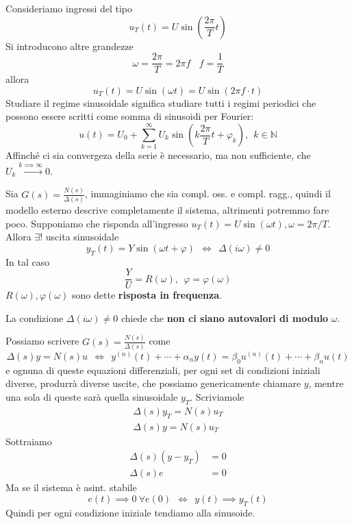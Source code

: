 Consideriamo ingressi del tipo
\begin{equation*}
	u_T(t) =U\sin\left(\frac{2\pi }{T} t\right)
\end{equation*}
Si introducono altre grandezze
\begin{equation*}
	\omega =\frac{2\pi }{T} =2\pi f\ \ \ \ f=\frac{1}{T}
\end{equation*}
allora
\begin{equation*}
	u_T(t) =U\sin(\omega t) =U\sin(2\pi f\cdotp t)
\end{equation*}
Studiare il regime sinusoidale significa studiare tutti i regimi periodici che possono essere scritti come somma di sinusoidi per Fourier:
\begin{equation*}
	u(t) =U_0 +\sum\limits ^{\infty }_{k=1} U_k\sin\left(k\frac{2\pi }{T} t+\varphi _k\right) ,\ \ k\in \mathbb{N}
\end{equation*}
Affinché ci sia convergeza della serie è necessario, ma non sufficiente, che $U_k\xrightarrow{k\implies \infty } 0$.
\begin{thm}
	Sia $G(s) =\frac{N(s)}{\Delta (s)}$, immaginiamo che sia compl. oss. e compl. ragg., quindi il modello esterno descrive completamente il sistema, altrimenti potremmo fare poco. Supponiamo che risponda all'ingresso $u_T(t) =U\sin(\omega t) ,\omega =2\pi /T$. Allora $\exists !$ uscita sinusoidale
	\begin{equation*}
		y_T(t) =Y\sin(\omega t+\varphi) \ \ \iff \ \ \Delta (i\omega) \neq 0
	\end{equation*}
	In tal caso
	\begin{equation*}
		\frac{Y}{U} =R(\omega) ,\ \ \varphi =\varphi (\omega)
	\end{equation*}
	$R(\omega) ,\varphi (\omega)$ sono dette \textbf{risposta in frequenza}.
\end{thm}
La condizione $\Delta (i\omega) \neq 0$ chiede che \textbf{non ci siano autovalori di modulo} $\omega $.

Possiamo scrivere $G(s) =\frac{N(s)}{\Delta (s)}$ come
\begin{equation*}
	\Delta (s) y=N(s) u\ \ \iff \ \ y^{(n)}(t) +\cdots +\alpha _n y(t) =\beta _0 u^{(n)}(t) +\cdots +\beta _n u(t)
\end{equation*}
e ognuna di queste equazioni differenziali, per ogni set di condizioni iniziali diverse, produrrà diverse uscite, che possiamo genericamente chiamare $y$, mentre una sola di queste sarà quella sinusoidale $y_T$. Scriviamole
\begin{gather*}
	\Delta (s) y_T =N(s) u_T\\
	\Delta (s) y=N(s) u_T
\end{gather*}
Sottraiamo
\begin{equation*}
	\begin{aligned}
		\Delta (s)(y-y_T) & =0 \\
		\Delta (s) e      & =0 
	\end{aligned}
\end{equation*}
Ma se il sistema è asint. stabile
\begin{equation*}
	e(t)\implies 0\ \forall e(0) \ \ \iff \ \ y(t)\implies y_T(t)
\end{equation*}
Quindi per ogni condizione iniziale tendiamo alla sinusoide.

